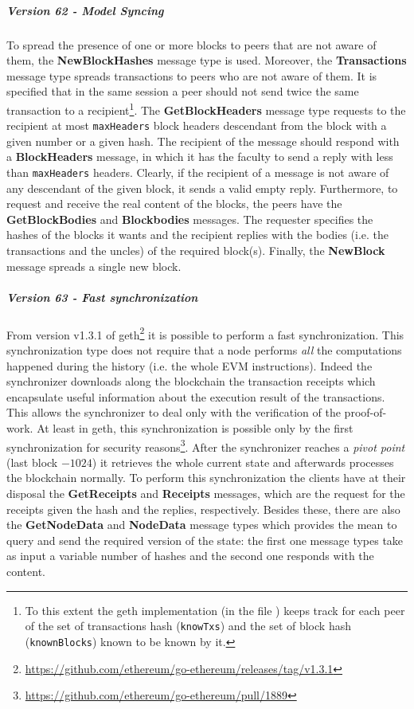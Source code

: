 \subparagraph{Version 62 - Model Syncing}
To spread the presence of one or more blocks to peers that are not aware of
them, the \textbf{NewBlockHashes} message type is used. Moreover, the
\textbf{Transactions} message type spreads transactions to peers who are not
aware of them. It is specified that in the same session a peer should not send
twice the same transaction to a recipient\footnote{To this extent the geth
implementation (in the file ) keeps track for each peer of the
set of transactions hash (\texttt{knowTxs}) and the set of block hash
(\texttt{knownBlocks}) known to be known by it.}. The \textbf{GetBlockHeaders}
message type requests to the recipient at most \texttt{maxHeaders} block headers
descendant from the block with a given number or a given hash. The recipient of
the message should respond with a \textbf{BlockHeaders} message, in which it has
the faculty to send a reply with less than \texttt{maxHeaders} headers. Clearly,
if the recipient of a message is not aware of any descendant of the given block,
it sends a valid empty reply. Furthermore, to request and receive the real
content of the blocks, the peers have the \textbf{GetBlockBodies} and
\textbf{Blockbodies} messages. The requester specifies the hashes of the blocks
it wants and the recipient replies with the bodies (i.e. the transactions and
the uncles) of the required block(s). Finally, the \textbf{NewBlock} message
spreads a single new block.

\subparagraph{Version 63 - Fast synchronization}
From version v1.3.1 of
geth\footnote{\url{https://github.com/ethereum/go-ethereum/releases/tag/v1.3.1}}
it is possible to perform a fast synchronization. This synchronization type does
not require that a node performs \emph{all} the computations happened during the
history (i.e. the whole EVM instructions). Indeed the synchronizer downloads
along the blockchain the transaction receipts which encapsulate useful
information about the execution result of the transactions. This allows the
synchronizer to deal only with the verification of the proof-of-work. At least
in geth, this synchronization is possible only by the first synchronization for
security
reasons\footnote{\url{https://github.com/ethereum/go-ethereum/pull/1889}}. After
the synchronizer reaches a \textit{pivot point} (last block $- 1024$) it
retrieves the whole current state and afterwards processes the blockchain
normally. To perform this synchronization the clients have at their disposal the
\textbf{GetReceipts} and \textbf{Receipts} messages, which are the request for
the receipts given the hash and the replies, respectively. Besides these, there
are also the \textbf{GetNodeData} and \textbf{NodeData} message types which
provides the mean to query and send the required version of the state: the first
one message types take as input a variable number of hashes and the second one
responds with the content.
